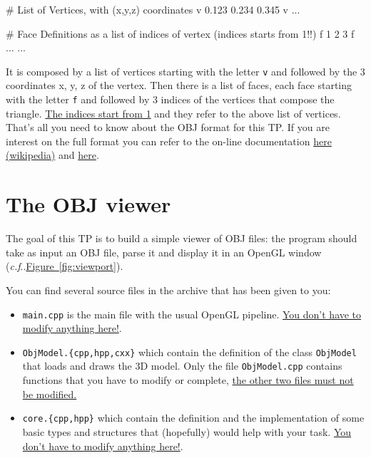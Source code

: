 \documentclass[a4paper,11pt]{article}
\makeatletter
\DeclareRobustCommand\onedot{\futurelet\@let@token\@onedot}
\def\@onedot{\ifx\@let@token.\else.\null\fi\xspace}
\def\cf{\emph{c.f}\onedot} \def\Cf{\emph{C.f}\onedot}
\newcommand{\hilight}[1]{\colorbox{bg}{#1}}
\newcommand{\coden}[1]{\texttt{#1}}
\newcommand{\code}[1]{\hilight{\texttt{#1}}}
\newcommand{\brand}[1]{\textsf{#1}\xspace}
\newcommand{\opengl}{\brand{OpenGL}}
\newcommand{\obj}{\brand{OBJ}}
\newcommand{\fig}[1]{\hyperref[#1]{\mbox{Figure \ref*{#1}}}\xspace}
\makeatother
\begin{document}
{\smaller
\begin{bashcode}
# List of Vertices, with (x,y,z) coordinates
v 0.123 0.234 0.345
v ...

# Face Definitions as a list of indices of vertex (indices starts from 1!!)
f 1 2 3
f ...
  ...
\end{bashcode}
}

\noindent It is composed by a list of vertices starting with the letter \code{v} and followed by the 3 coordinates x, y, z of the vertex. Then there is a list of faces, each face starting with the letter \code{f} and followed by 3 indices of the vertices that compose the triangle. \uline{The indices start from 1} and they refer to the above list of vertices. That's all you need to know about the \obj format for this TP. If you are interest on the full format you can refer to the on-line documentation \href{http://en.wikipedia.org/wiki/Wavefront_.obj_file}{here (wikipedia)} and \href{http://www.martinreddy.net/gfx/3d/OBJ.spec}{here}. 



\section{The OBJ viewer}

The goal of this TP is to build a simple viewer of \obj files: the program should take as input an \obj file, parse it and display it in an \opengl window (\cf \fig{fig:viewport}). 

You can find several source files in the archive that has been given to you:

\begin{itemize}

	\item \code{main.cpp} is the main file with the usual \opengl pipeline. \uline{You don't have to modify anything here!}. 

	\item \code{ObjModel.\{cpp,hpp,cxx\}} which contain the definition of the class \coden{ObjModel} that loads and draws the 3D model. Only the file \code{ObjModel.cpp} contains functions that you have to modify or complete, \uline{the other two files must not be modified.}

	\item \code{core.\{cpp,hpp\}} which contain the definition and the implementation of some basic types and structures that (hopefully) would help with your task. \uline{You don't have to modify anything here!}. 
\end{itemize}
 
\end{document}
